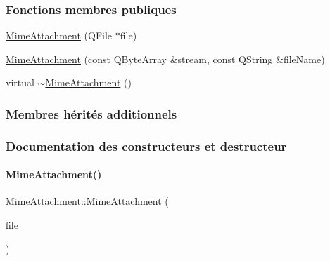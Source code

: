 \subsubsection*{Fonctions membres publiques}
\begin{DoxyCompactItemize}
\item 
\hyperlink{class_simple_mail_1_1_mime_attachment_a6ee416630dfc09de9fd116a14eeca168}{Mime\+Attachment} (Q\+File $\ast$file)
\item 
\hyperlink{class_simple_mail_1_1_mime_attachment_a70681801131cf35515daaf4dd2d35cba}{Mime\+Attachment} (const Q\+Byte\+Array \&stream, const Q\+String \&file\+Name)
\item 
virtual \hyperlink{class_simple_mail_1_1_mime_attachment_aac25990be48662219fdf34013fd9871d}{$\sim$\+Mime\+Attachment} ()
\end{DoxyCompactItemize}
\subsubsection*{Membres hérités additionnels}


\subsubsection{Documentation des constructeurs et destructeur}
\mbox{\label{class_simple_mail_1_1_mime_attachment_a6ee416630dfc09de9fd116a14eeca168}} 
\paragraph{\texorpdfstring{Mime\+Attachment()}{MimeAttachment()}\hspace{0.1cm}{\footnotesize\ttfamily [1/2]}}
{\footnotesize\ttfamily Mime\+Attachment\+::\+Mime\+Attachment (\begin{DoxyParamCaption}\item[{Q\+File $\ast$}]{file }\end{DoxyParamCaption})}


